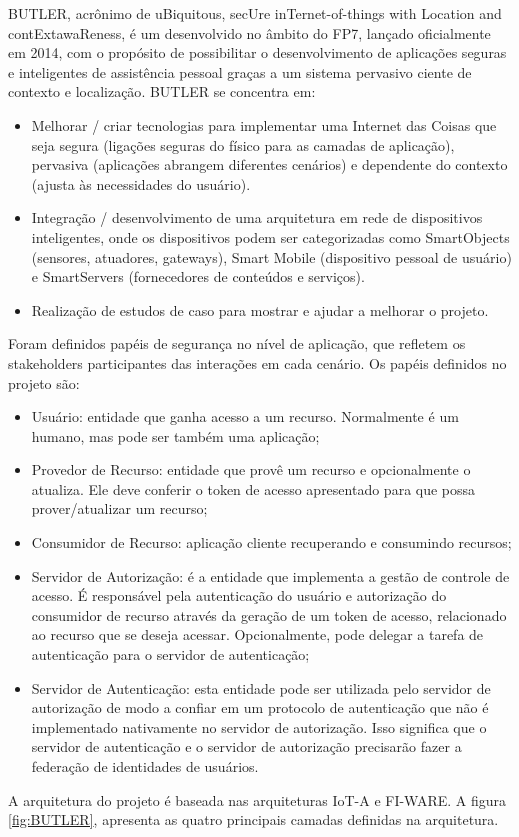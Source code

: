 BUTLER, acrônimo de uBiquitous, secUre inTernet-of-things with Location
and contExtawaReness, é um desenvolvido no âmbito do FP7, lançado
oficialmente em 2014, com o propósito de possibilitar o \textquotedbl{}desenvolvimento
de aplicações seguras e inteligentes de assistência pessoal graças
a um sistema pervasivo ciente de contexto e localização\textquotedbl{}\cite{BUTLER}.
BUTLER se concentra em:
\begin{itemize}
\item Melhorar / criar tecnologias para implementar uma Internet das Coisas
que seja segura (ligações seguras do físico para as camadas de aplicação),
pervasiva (aplicações abrangem diferentes cenários) e dependente do
contexto (ajusta às necessidades do usuário).
\item Integração / desenvolvimento de uma arquitetura em rede de dispositivos
inteligentes, onde os dispositivos podem ser categorizadas como SmartObjects
(sensores, atuadores, gateways), Smart Mobile (dispositivo pessoal
de usuário) e SmartServers (fornecedores de conteúdos e serviços).
\item Realização de estudos de caso para mostrar e ajudar a melhorar o projeto.
\end{itemize}
Foram definidos papéis de segurança no nível de aplicação, que refletem
os stakeholders participantes das interações em cada cenário. Os papéis
definidos no projeto são\cite{BUTLER:tec}:
\begin{itemize}
\item Usuário: entidade que ganha acesso a um recurso. Normalmente é um
humano, mas pode ser também uma aplicação;
\item Provedor de Recurso: entidade que provê um recurso e opcionalmente
o atualiza. Ele deve conferir o token de acesso apresentado para que
possa prover/atualizar um recurso;
\item Consumidor de Recurso: aplicação cliente recuperando e consumindo
recursos;
\item Servidor de Autorização: é a entidade que implementa a gestão de controle
de acesso. É responsável pela autenticação do usuário e autorização
do consumidor de recurso através da geração de um token de acesso,
relacionado ao recurso que se deseja acessar. Opcionalmente, pode
delegar a tarefa de autenticação para o servidor de autenticação;
\item Servidor de Autenticação: esta entidade pode ser utilizada pelo servidor
de autorização de modo a confiar em um protocolo de autenticação que
não é implementado nativamente no servidor de autorização. Isso significa
que o servidor de autenticação e o servidor de autorização precisarão
fazer a federação de identidades de usuários.
\end{itemize}
A arquitetura do projeto é baseada nas arquiteturas IoT-A e FI-WARE.
A figura \ref{fig:BUTLER}, apresenta as quatro principais camadas
definidas na arquitetura. 

